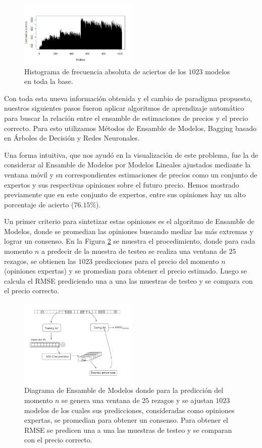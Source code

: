 \documentclass[a4paper,12pt,twocolumn]{article}
\begin{document}
\begin{figure}[!hbt]
\centering
\includegraphics[width=0.5\textwidth]{histograma}
\caption{Histograma de frecuencia absoluta de aciertos de los $1023$ modelos en toda la base.}
\label{histograma}
\end{figure}

Con toda esta nueva información obtenida y el cambio de paradigma propuesto, nuestros siguientes pasos fueron aplicar algoritmos de aprendizaje automático para buscar la relación entre el ensamble de estimaciones de precios y el precio correcto. Para esto utilizamos Métodos de Ensamble de Modelos, Bagging basado en Árboles de Decisión y Redes Neuronales.

Una forma intuitiva, que nos ayudó en la visualización de este problema, fue la de considerar al Ensamble de Modelos por Modelos Lineales ajustados mediante la ventana móvil y su correspondientes estimaciones de precios como un conjunto de expertos y sus respectivas opiniones sobre el futuro precio. Hemos mostrado previamente que en este conjunto de expertos, entre sus opiniones hay un alto porcentaje de acierto ($76.15\%$). 

Un primer criterio para sintetizar estas opiniones es el algoritmo de Ensamble de Modelos, donde se promedian las opiniones buscando mediar las  más extremas y lograr un consenso. En la Figura \ref{diagramExpertMean} se muestra el procedimiento, donde para cada momento $n$ a predecir de la muestra de testeo se realiza una ventana de $25$ rezagos, se obtienen las $1023$ predicciones para el precio del momento $n$ (opiniones expertas) y se promedian para obtener el precio estimado. Luego se calcula el RMSE prediciendo una a una las muestras de testeo y se compara con el precio correcto.

\begin{figure}[!hbt]
\centering
\includegraphics[width=0.5\textwidth]{diagramExpertMean}
\caption{Diagrama de Ensamble de Modelos donde para la predicción del momento $n$ se genera una ventana de $25$ rezagos y se ajustan $1023$ modelos de los cuales sus predicciones, consideradas como opiniones expertas, se promedian para obtener un consenso. Para obtener el RMSE se predicen una a una las muestras de testeo y se comparan con el precio correcto.}
\label{diagramExpertMean}
\end{figure}
\end{document}
